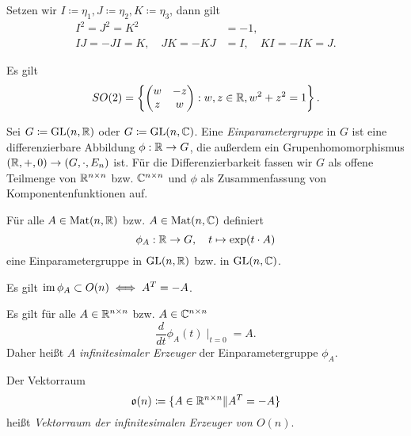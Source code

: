 \documentclass{cheat-sheet}
\newcommand{\GL}{\mathrm{GL}}
\newcommand{\Mat}{\mathrm{Mat}}
\begin{document}
\begin{defn}
Setzen wir $I \coloneqq \eta_1, J \coloneqq \eta_2, K \coloneqq \eta_3$, dann gilt
\begin{align*}
I^2 = J^2 = K^2 &= -1, \\
IJ = -JI = K, \quad JK = -KJ &= I, \quad KI = -IK = J.
\end{align*}
\end{defn}

\begin{satz}
Es gilt
\[ SO(2) = \left\{ \begin{pmatrix} w & -z \\ z & w \end{pmatrix} : w, z \in \mathbb{R}, w^2 + z^2 = 1 \right\}. \]
\end{satz}


\begin{defn}
Sei $G \coloneqq \GL(n, \R)$ oder $G \coloneqq \GL(n, \C)$. Eine \emph{Einparametergruppe} in $G$ ist eine differenzierbare Abbildung $\phi : \mathbb{R} \to G$, die außerdem ein Grupenhomomorphismus $(\mathbb{R}, +, 0) \to (G, \cdot, E_n)$ ist. Für die Differenzierbarkeit fassen wir $G$ als offene Teilmenge von $\mathbb{R}^{n \times n}$ bzw. $\mathbb{C}^{n \times n}$ und $\phi$ als Zusammenfassung von Komponentenfunktionen auf.
\end{defn}

\begin{satz}
Für alle $A \in \Mat(n, \R)$ bzw. $A \in \Mat(n, \C)$ definiert
\[ \phi_A : \mathbb{R} \to G, \quad t \mapsto \exp(t \cdot A) \]
eine Einparametergruppe in $\GL(n, \R)$ bzw. in $\GL(n, \C)$.
\end{satz}

\begin{satz}
Es gilt $\mathop{\mathrm{im}} \phi_A \subset O(n) \iff A^T = -A$.
\end{satz}

\begin{bem}
Es gilt für alle $A \in \mathbb{R}^{n \times n}$ bzw. $A \in \mathbb{C}^{n \times n}$
\[ \frac{d}{dt} \phi_A(t) \mid_{t=0} = A. \]
Daher heißt $A$ \emph{infinitesimaler Erzeuger} der Einparametergruppe $\phi_A$.
\end{bem}

\begin{defn}
Der Vektorraum
\[ \mathfrak{o}(n) \coloneqq \{ A \in \mathbb{R}^{n \times n} \| A^T = - A \} \]
heißt \emph{Vektorraum der infinitesimalen Erzeuger von $O(n)$}.
\end{defn}
\end{document}

